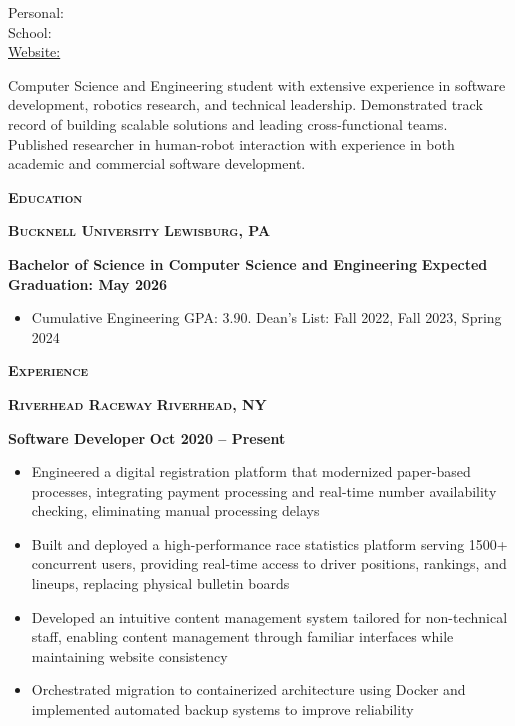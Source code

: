 \documentclass{article}
\newlength{\sectspaceabove}
\newlength{\sectspacebelow}
\newcommand{\textscbf}[1]{\textbf{\textsc{#1}}}
\newcommand{\resumesection}[1]{%
    \vspace{\sectspaceabove}%
    \begin{center}
        \textscbf{#1}
    \end{center}%
    \vspace{\sectspacebelow}%
}
\begin{document}
\begin{center}
    {\large \textscbf{\personalName}}
\end{center}

\noindent
\begin{minipage}[t]{\textwidth} 
    \centering
    Personal: \personalEmail \\
    School: \personalSchoolEmail \\
    \href{https://\personalWebsite}{Website: \personalWebsite}
\end{minipage}

\vspace{1em}

\noindent
\begin{minipage}{\textwidth}
    Computer Science and Engineering student with extensive experience in software development, robotics research, and technical leadership. 
    Demonstrated track record of building scalable solutions and leading cross-functional teams. 
    Published researcher in human-robot interaction with experience in both academic and commercial software development.
\end{minipage}

\resumesection{Education}

\textscbf{Bucknell University} \hfill \textscbf{Lewisburg, PA}

\textbf{Bachelor of Science in Computer Science and Engineering} \hfill \textbf{Expected Graduation: May 2026}
\begin{itemize}[noitemsep,topsep=2pt]
    \item Cumulative Engineering GPA: 3.90. Dean's List: Fall 2022, Fall 2023, Spring 2024
\end{itemize}

\resumesection{Experience}

\textscbf{Riverhead Raceway} \hfill \textscbf{Riverhead, NY}

\textbf{Software Developer} \hfill \textbf{Oct 2020 – Present}
\begin{itemize}[noitemsep,topsep=2pt]
	\item Engineered a digital registration platform that modernized paper-based processes, integrating payment processing and real-time number availability checking, eliminating manual processing delays
	\item Built and deployed a high-performance race statistics platform serving 1500+ concurrent users, providing real-time access to driver positions, rankings, and lineups, replacing physical bulletin boards
	\item Developed an intuitive content management system tailored for non-technical staff, enabling content management through familiar interfaces while maintaining website consistency
	\item Orchestrated migration to containerized architecture using Docker and implemented automated backup systems to improve reliability
\end{itemize}
\end{document}
